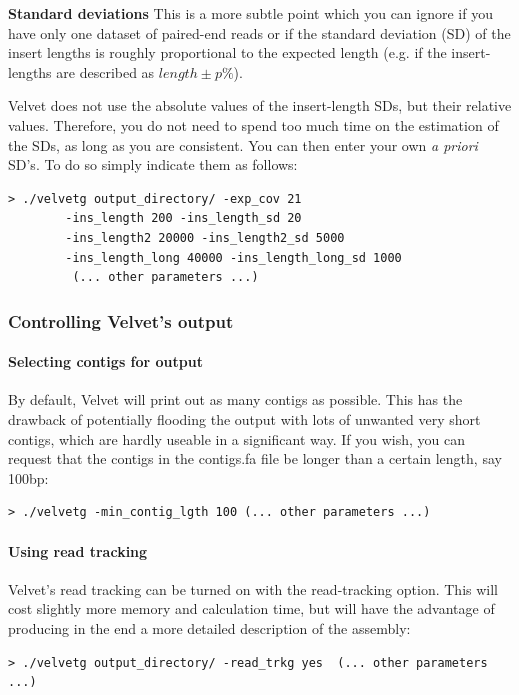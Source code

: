 \documentclass{article}
\begin{document}
\textbf{Standard deviations} This is a more subtle point which you can ignore if you have only one dataset of paired-end reads or if the standard deviation (SD) of the insert lengths is roughly proportional to the expected length (e.g. if the insert-lengths are described as $length \pm p\%$).

Velvet does not use the absolute values of the insert-length SDs, but their relative values. Therefore, you do not need to spend too much time on the estimation of the SDs, as long as you are consistent. You can then enter your own \emph{a priori} SD's. To do so simply indicate them as follows:

\begin{verbatim}
> ./velvetg output_directory/ -exp_cov 21 
		-ins_length 200 -ins_length_sd 20
		-ins_length2 20000 -ins_length2_sd 5000
		-ins_length_long 40000 -ins_length_long_sd 1000
		 (... other parameters ...)
\end{verbatim}

	\subsubsection{Controlling Velvet's output}

	\paragraph{Selecting contigs for output}

By default, Velvet will print out as many contigs as possible. This has the drawback of potentially flooding the output with lots of unwanted very short contigs, which are hardly useable in a significant way. If you wish, you can request that the contigs in the contigs.fa file be longer than a certain length, say 100bp:

\begin{verbatim}
> ./velvetg -min_contig_lgth 100 (... other parameters ...)
\end{verbatim}

	\paragraph{Using read tracking} 
	
Velvet's read tracking can be turned on with the read-tracking option. This will cost slightly more memory and calculation time, but will have the advantage of producing in the end a more detailed description of the assembly:

\begin{verbatim}
> ./velvetg output_directory/ -read_trkg yes  (... other parameters ...)
\end{verbatim}
\end{document}
